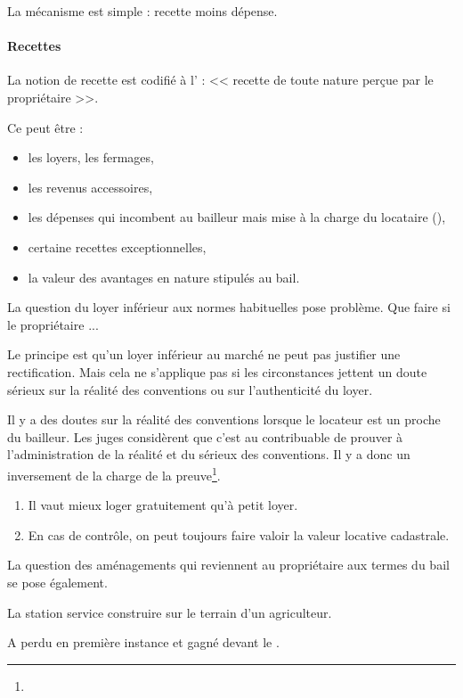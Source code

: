 			La mécanisme est simple : recette moins dépense.

			\paragraph{Recettes} La notion de recette est codifié à l' : << recette de toute nature perçue par le propriétaire >>.

				Ce peut être :
				\begin{itemize}
					\item les loyers, les fermages,
					\item les revenus accessoires,
					\item les dépenses qui incombent au bailleur mais mise à la charge du locataire (),
					\item certaine recettes exceptionnelles,
					\item la valeur des avantages en nature stipulés au bail.
				\end{itemize}

				\medbreak La question du loyer inférieur aux normes habituelles pose problème. Que faire si le propriétaire ...

				Le principe est qu'un loyer inférieur au marché ne peut pas justifier une rectification. Mais cela ne s'applique pas si les circonstances jettent un doute sérieux sur la réalité des conventions ou sur l'authenticité du loyer.

				Il y a des doutes sur la réalité des conventions lorsque le locateur est un proche du bailleur. Les juges considèrent que c'est au contribuable de prouver à l'administration de la réalité et du sérieux des conventions. Il y a donc un inversement de la charge de la preuve\footnote{}.

				\begin{conseil}
					\begin{enumerate}
						\item Il vaut mieux loger gratuitement qu'à petit loyer.
						\item En cas de contrôle, on peut toujours faire valoir la valeur locative cadastrale.
					\end{enumerate}
				\end{conseil}

				\medbreak La question des aménagements qui reviennent au propriétaire aux termes du bail se pose également.

				\begin{exemple}
					La station service construire sur le terrain d'un agriculteur.

					A perdu en première instance et gagné devant le \CE.
				\end{exemple}

